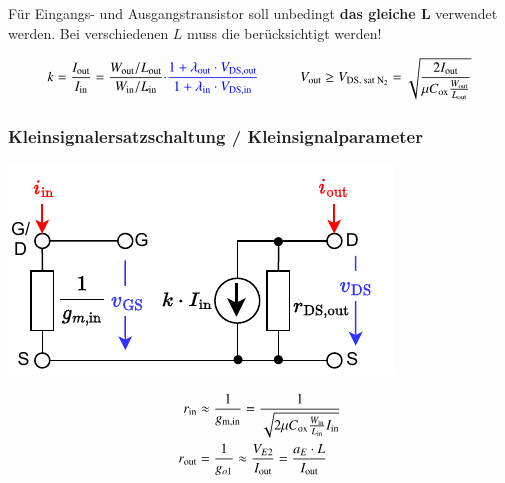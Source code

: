 Für Eingangs- und Ausgangstransistor soll unbedingt \textbf{das gleiche $\bm{L}$} verwendet werden.
Bei verschiedenen $L$ muss die  berücksichtigt werden!

\vspace{-0.2cm}

\[
    k = \frac{I_\text{out}}{I_\text{in}} = \frac{W_\text{out}/L_\text{out}}{W_\text{in}/L_\text{in}} {\color{blue} \cdot \frac{1 + \lambda_{\rm out} \cdot V_{\rm DS,out}}{1 + \lambda_{\rm in} \cdot V_{\rm DS,in}} }   \qquad \quad
    V_\text{out} \geq V_\text{DS, sat $\text{N}_2$} = \sqrt{\frac{2 I_\text{out}}{\mu C_\text{ox}\frac{W_{\rm out}}{L_{\rm out}}}}
\]

\subsubsection{Kleinsignalersatzschaltung / Kleinsignalparameter}

\vspace{-0.2cm}

\begin{minipage}[t]{0.48\columnwidth}
    \includegraphics[width=\columnwidth, align=t]{images/06_stromspiegel_kleinsignalersatzschaltung.pdf}
\end{minipage}
\hfill
\begin{minipage}[t]{0.48\columnwidth}

    \begin{align*}
        r_{\rm in}  &\approx \frac{1}{g_{\rm m, in}} = \frac{1}{\sqrt{2 \mu C_{\rm ox} \frac{W_{\rm in}}{L_{\rm in}} I_{\rm in}}} \\
        r_{\rm out} &= \frac{1}{g_{o1}} \approx \frac{V_{E2}}{I_{\rm out}} = \frac{a_E \cdot L}{I_{\rm out}}
    \end{align*}
\end{minipage}


